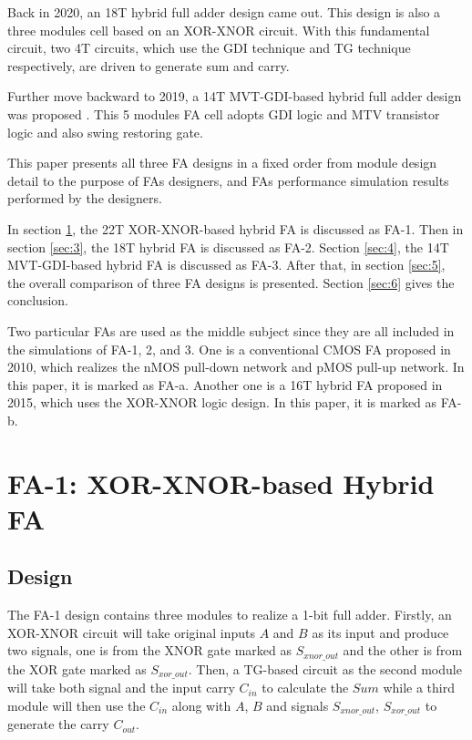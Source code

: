 \documentclass[conference]{IEEEtran}
\begin{document}
Back in 2020, an 18T hybrid full adder design \cite{9339799} came out.
This design is also a three modules cell based on an XOR-XNOR circuit.
With this fundamental circuit, two 4T circuits, which use the GDI technique and TG technique respectively, are driven to generate sum and carry.

Further move backward to 2019, a 14T MVT-GDI-based hybrid full adder design was proposed \cite{18743001}.
This 5 modules FA cell adopts GDI logic and MTV transistor logic and also swing restoring gate.

This paper presents all three FA designs in a fixed order
from module design detail to the purpose of FAs designers, and FAs performance simulation results performed by the designers.

In section \ref{sec:2}, the 22T XOR-XNOR-based hybrid FA is discussed as FA-1.
Then in section \ref{sec:3}, the 18T hybrid FA is discussed as FA-2.
Section \ref{sec:4}, the 14T MVT-GDI-based hybrid FA is discussed as FA-3.
After that, in section \ref{sec:5}, the overall comparison of three FA designs is presented.
Section \ref{sec:6} gives the conclusion.

Two particular FAs are used as the middle subject since they are all included in the simulations of FA-1, 2, and 3.
One is a conventional CMOS FA proposed in 2010\cite{weste2010cmos}, which realizes the nMOS pull-down network and pMOS pull-up network.
In this paper, it is marked as FA-a.
Another one is a 16T hybrid FA proposed in 2015\cite{15484823}, which uses the XOR-XNOR logic design.
In this paper, it is marked as FA-b.


\section{FA-1: XOR-XNOR-based Hybrid FA}
\label{sec:2}

\subsection{Design}

The FA-1 \cite{20212210429416} design contains three modules to realize a 1-bit full adder.
Firstly, an XOR-XNOR circuit will take original inputs \(A\) and \(B\) as its input and produce two signals,
one is from the XNOR gate marked as \(S_{xnor\_out}\) and the other is from the XOR gate marked as \( S_{xor\_out}\).
Then, a TG-based circuit as the second module will take both signal and the input carry \(C_{in}\) to calculate the \(Sum\)
while a third module will then use the \(C_{in}\) along with \(A\), \(B\) and signals \(S_{xnor\_out}\), \( S_{xor\_out}\) to generate the carry \(C_{out}\).
\end{document}
